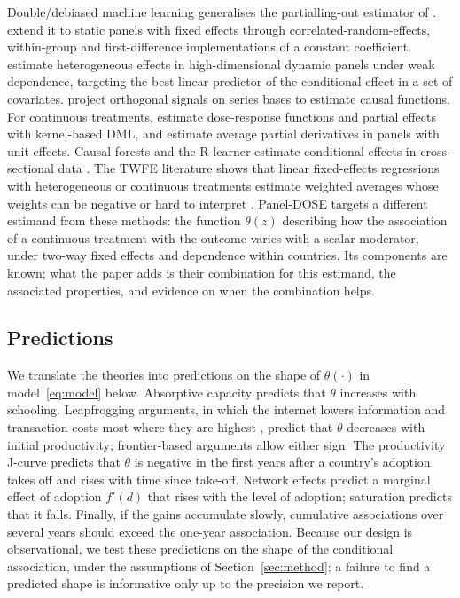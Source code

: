 \documentclass[preprint,12pt,authoryear]{elsarticle}
\begin{document}
Double/debiased machine learning \citep{chernozhukov2018dml} generalises the partialling-out estimator of \citet{robinson1988}. \citet{clarke2023panel} extend it to static panels with fixed effects through correlated-random-effects, within-group and first-difference implementations of a constant coefficient. \citet{semenova2023panel} estimate heterogeneous effects in high-dimensional dynamic panels under weak dependence, targeting the best linear predictor of the conditional effect in a set of covariates. \citet{semenova2021cate} project orthogonal signals on series bases to estimate causal functions. For continuous treatments, \citet{colangelo2026continuous} estimate dose-response functions and partial effects with kernel-based DML, and \citet{klosin2022continuous} estimate average partial derivatives in panels with unit effects. Causal forests and the R-learner estimate conditional effects in cross-sectional data \citep{wager2018forest,athey2019grf,nie2021quasi}. The TWFE literature shows that linear fixed-effects regressions with heterogeneous or continuous treatments estimate weighted averages whose weights can be negative or hard to interpret \citep{dechaisemartin2020twfe,callaway2024continuous}. Panel-DOSE targets a different estimand from these methods: the function $\theta(z)$ describing how the association of a continuous treatment with the outcome varies with a scalar moderator, under two-way fixed effects and dependence within countries. Its components are known; what the paper adds is their combination for this estimand, the associated properties, and evidence on when the combination helps.

\subsection{Predictions}\label{sec:pred}

We translate the theories into predictions on the shape of $\theta(\cdot)$ in model~\eqref{eq:model} below. Absorptive capacity \citep{nelson1966,benhabib1994,akerman2015broadband} predicts that $\theta$ increases with schooling. Leapfrogging arguments, in which the internet lowers information and transaction costs most where they are highest \citep{hjort2019internet}, predict that $\theta$ decreases with initial productivity; frontier-based arguments \citep{acemoglu2006frontier} allow either sign. The productivity J-curve \citep{brynjolfsson2021jcurve} predicts that $\theta$ is negative in the first years after a country's adoption takes off and rises with time since take-off. Network effects predict a marginal effect of adoption $f'(d)$ that rises with the level of adoption; saturation predicts that it falls. Finally, if the gains accumulate slowly, cumulative associations over several years should exceed the one-year association. Because our design is observational, we test these predictions on the shape of the conditional association, under the assumptions of Section~\ref{sec:method}; a failure to find a predicted shape is informative only up to the precision we report.
\end{document}
